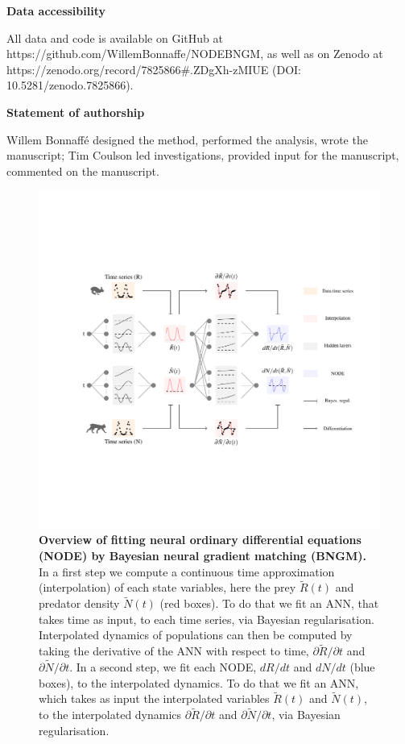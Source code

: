 \documentclass[11pt, oneside]{article}
\begin{document}
\textbf{Data accessibility}

All data and code is available on GitHub at https://github.com/WillemBonnaffe/NODEBNGM, as well as on Zenodo at https://zenodo.org/record/7825866\#.ZDgXh-zMIUE (DOI: 10.5281/zenodo.7825866).

\textbf{Statement of authorship}

Willem Bonnaff\'e designed the method, performed the analysis, wrote the manuscript; 
Tim Coulson led investigations, provided input for the manuscript, commented on the manuscript.

\printbibliography 

\newpage
{}

\newpage
\begin{figure}[H]
\includegraphics[width=\linewidth,page=1]{figures/main.pdf}
\caption{
    \textbf{Overview of fitting neural ordinary differential equations (NODE) by Bayesian neural gradient matching (BNGM).}
    In a first step we compute a continuous time approximation (interpolation) of each state variables, here the prey $\tilde{R}(t)$ and predator density $\tilde{N}(t)$ (red boxes).
    To do that we fit an ANN, that takes time as input, to each time series, via Bayesian regularisation.
    Interpolated dynamics of populations can then be computed by taking the derivative of the ANN with respect to time, $\partial\tilde{R}/\partial t$ and $\partial\tilde{N}/\partial t$.
    In a second step, we fit each NODE, $dR/dt$ and $dN/dt$ (blue boxes), to the interpolated dynamics.
    To do that we fit an ANN, which takes as input the interpolated variables $\tilde{R}(t)$ and $\tilde{N}(t)$, to the interpolated dynamics $\partial\tilde{R}/\partial t$ and $\partial\tilde{N}/\partial t$, via Bayesian regularisation.
}
\end{figure}
\newpage
\end{document}
